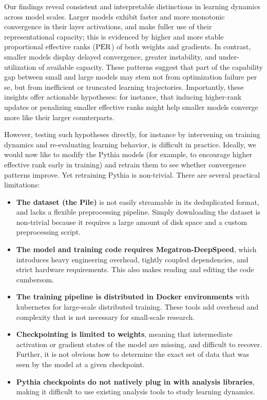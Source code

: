 Our findings reveal consistent and interpretable distinctions in learning dynamics across model scales. Larger models exhibit faster and more monotonic convergence in their layer activations, and make fuller use of their representational capacity; this is evidenced by higher and more stable proportional effective ranks ($\mathrm{PER}$) of both weights and gradients. In contrast, smaller models display delayed convergence, greater instability, and under-utilization of available capacity. These patterns suggest that part of the capability gap between small and large models may stem not from optimization failure per se, but from inefficient or truncated learning trajectories. Importantly, these insights offer actionable hypotheses: for instance, that inducing higher-rank updates or penalizing smaller effective ranks might help smaller models converge more like their larger counterparts. 

However, testing such hypotheses directly, for instance by intervening on training dynamics and re-evaluating learning behavior, is difficult in practice. Ideally, we would now like to modify the Pythia models (for example, to encourage higher effective rank early in training) and retrain them to see whether convergence patterns improve. Yet retraining Pythia is non-trivial. There are several practical limitations:

\begin{itemize}[label=\xmark]
    \item \textbf{The dataset (the Pile)} is not easily streamable in its deduplicated format, and lacks a flexible preprocessing pipeline. Simply downloading the dataset is non-trivial because it requires a large amount of disk space and a custom preprocessing script.
    \item \textbf{The model and training code requires Megatron-DeepSpeed}, which introduces heavy engineering overhead, tightly coupled dependencies, and strict hardware requirements. This also makes reading and editing the code cumbersom.
    \item \textbf{The training pipeline is distributed in Docker environments} with kubernetes for large-scale distributed training. These tools add overhead and complexity that is not necessary for small-scale research.
    \item \textbf{Checkpointing is limited to weights}, meaning that intermediate activation or gradient states of the model are missing, and difficult to recover. Further, it is not obvious how to determine the exact set of data that was seen by the model at a given checkpoint. 
    \item \textbf{Pythia checkpoints do not natively plug in with analysis libraries}, making it difficult to use existing analysis tools to study learning dynamics.
\end{itemize}

